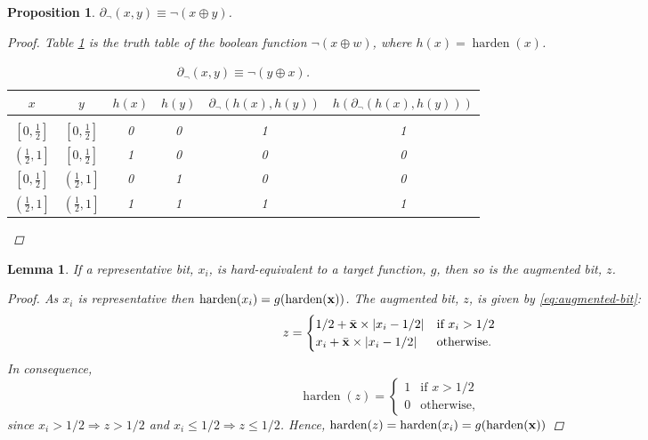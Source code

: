 \documentclass{article} %
\newtheorem{prop}{Proposition}
\newtheorem{lemma}{Lemma}
\begin{document}
\begin{prop}\label{prop:not}
	$\partial_{\neg}(x,y) \equiv \neg (x \oplus y)$.
\begin{proof}
	Table \ref{not-table} is the truth table of the boolean function $\neg (x \oplus w)$, where $h(x) = \operatorname{harden}(x)$.
	\begin{table}[h!]
		\begin{center}
			\begin{tabular}{cccccc}
				\multicolumn{1}{c}{$x$}  &\multicolumn{1}{c}{$y$}  &\multicolumn{1}{c}{$h(x)$}  &\multicolumn{1}{c}{$h(y)$} &\multicolumn{1}{c}{$\partial_{\neg}(h(x), h(y))$} &\multicolumn{1}{c}{$h(\partial_{\neg}(h(x), h(y)))$}
				\\ \hline \\
				$\left[0, \frac{1}{2}\right]$ & $\left[0, \frac{1}{2}\right]$ & 0 & 0 & 1 & 1\\[0.1cm]
				$\left(\frac{1}{2}, 1\right]$ & $\left[0, \frac{1}{2}\right]$ &1 & 0 & 0 & 0\\[0.1cm]
				$\left[0, \frac{1}{2}\right]$ & $\left(\frac{1}{2}, 1\right]$ &0 & 1 & 0 & 0\\[0.1cm]
				$\left(\frac{1}{2}, 1\right]$ & $\left(\frac{1}{2}, 1\right]$ &1 & 1 & 1 & 1\\[0.1cm]
			\end{tabular}
		\end{center}
		\caption{$\partial_{\neg}(x,y) \equiv \neg (y \oplus x)$.}\label{not-table}
	\end{table}
\end{proof}
\end{prop}

\begin{lemma}\label{prop:augmented}
	If a representative bit, $x_{i}$, is hard-equivalent to a target function, $g$, then so is the augmented bit, $z$.
	\begin{proof}
		As $x_{i}$ is representative then $\operatorname{harden}(x_{i}) = g(\operatorname{harden}({\bf x}))$. The augmented bit, $z$, is given by  \eqref{eq:augmented-bit}:
		\begin{equation*}
		z = \begin{cases}
		1/2 + \bar{\bf x}\times|x_{i} - 1/2| & \text{if } x_{i} > 1/2 \\
		x_{i} + \bar{\bf x}\times|x_{i} - 1/2| & \text{otherwise.}
		\end{cases}
		\end{equation*}
		In consequence,
		\begin{equation*}
		\operatorname{harden}(z) = \begin{cases}
		1 & \text{if } x > 1/2 \\
		0 & \text{otherwise,}
		\end{cases}
		\end{equation*}
		since $x_{i} > 1/2 \Rightarrow z > 1/2$ and $x_{i} \leq 1/2 \Rightarrow z \leq 1/2$. Hence, $\operatorname{harden}(z) = \operatorname{harden}(x_{i}) = g(\operatorname{harden}({\bf x}))$
	\end{proof}
\end{lemma}
\end{document}
